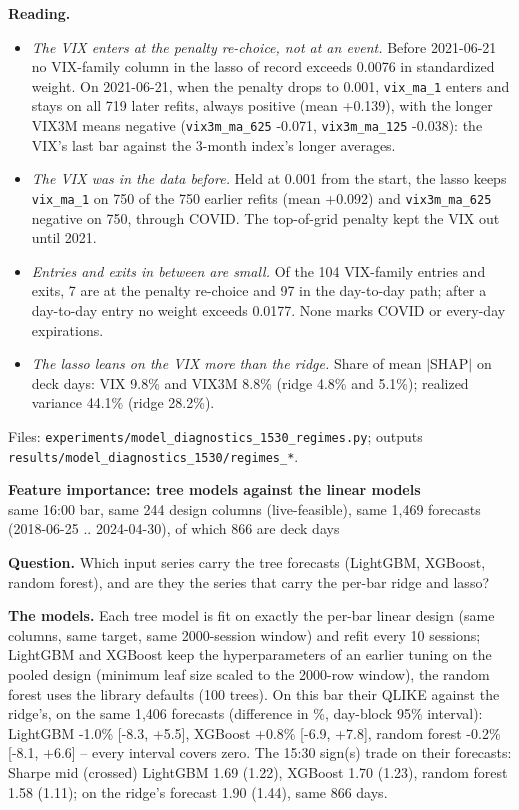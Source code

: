 \documentclass[10pt]{article}
\begin{document}
\enlargethispage{3\baselineskip}
\textbf{Reading.}
\begin{itemize}\itemsep1pt
\item \emph{The VIX enters at the penalty re-choice, not at an event.} Before 2021-06-21 no VIX-family column in the lasso of record exceeds 0.0076 in standardized weight. On 2021-06-21, when the penalty drops to 0.001, \texttt{vix\_ma\_1} enters and stays on all 719 later refits, always positive (mean +0.139), with the longer VIX3M means negative (\texttt{vix3m\_ma\_625} -0.071, \texttt{vix3m\_ma\_125} -0.038): the VIX's last bar against the 3-month index's longer averages.
\item \emph{The VIX was in the data before.} Held at 0.001 from the start, the lasso keeps \texttt{vix\_ma\_1} on 750 of the 750 earlier refits (mean +0.092) and \texttt{vix3m\_ma\_625} negative on 750, through COVID. The top-of-grid penalty kept the VIX out until 2021.
\item \emph{Entries and exits in between are small.} Of the 104 VIX-family entries and exits, 7 are at the penalty re-choice and 97 in the day-to-day path; after a day-to-day entry no weight exceeds 0.0177. None marks COVID or every-day expirations.
\item \emph{The lasso leans on the VIX more than the ridge.} Share of mean $|$SHAP$|$ on deck days: VIX 9.8\% and VIX3M 8.8\% (ridge 4.8\% and 5.1\%); realized variance 44.1\% (ridge 28.2\%).
\end{itemize}
Files: \texttt{experiments/model\_diagnostics\_1530\_regimes.py}; outputs \texttt{results/model\_diagnostics\_1530/regimes\_*}.

\clearpage
\begin{center}{\large\bf Feature importance: tree models against the linear models}\\[2pt]
{\small same 16:00 bar, same 244 design columns (live-feasible), same 1,469 forecasts (2018-06-25 .. 2024-04-30), of which 866 are deck days}\end{center}

\textbf{Question.} Which input series carry the tree forecasts (LightGBM, XGBoost, random forest), and are they the series that carry the per-bar ridge and lasso?

\textbf{The models.} Each tree model is fit on exactly the per-bar linear design (same columns, same target, same 2000-session window) and refit every 10 sessions; LightGBM and XGBoost keep the hyperparameters of an earlier tuning on the pooled design (minimum leaf size scaled to the 2000-row window), the random forest uses the library defaults (100 trees). On this bar their QLIKE against the ridge's, on the same 1,406 forecasts (difference in \%, day-block 95\% interval): LightGBM -1.0\% [-8.3, +5.5], XGBoost +0.8\% [-6.9, +7.8], random forest -0.2\% [-8.1, +6.6] -- every interval covers zero. The 15:30 sign(s) trade on their forecasts: Sharpe mid (crossed) LightGBM 1.69 (1.22), XGBoost 1.70 (1.23), random forest 1.58 (1.11); on the ridge's forecast 1.90 (1.44), same 866 days.
\end{document}
